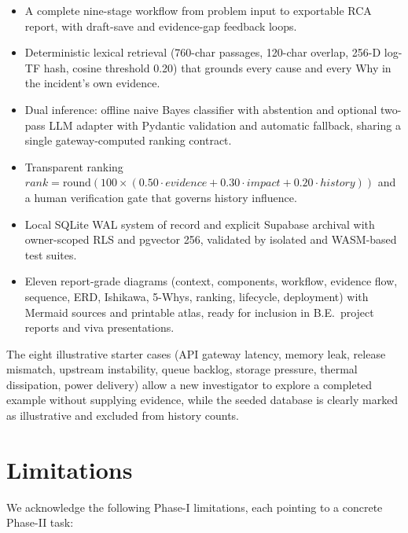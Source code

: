\documentclass[12pt,a4paper,oneside]{report}
\begin{document}
\begin{itemize}
\item A complete nine-stage workflow from problem input to exportable RCA report, with draft-save and evidence-gap feedback loops.
\item Deterministic lexical retrieval (760-char passages, 120-char overlap, 256-D log-TF hash, cosine threshold 0.20) that grounds every cause and every Why in the incident's own evidence.
\item Dual inference: offline naive Bayes classifier with abstention and optional two-pass LLM adapter with Pydantic validation and automatic fallback, sharing a single gateway-computed ranking contract.
\item Transparent ranking $rank = \text{round}(100\times(0.50\cdot evidence+0.30\cdot impact+0.20\cdot history))$ and a human verification gate that governs history influence.
\item Local SQLite WAL system of record and explicit Supabase archival with owner-scoped RLS and pgvector 256, validated by isolated and WASM-based test suites.
\item Eleven report-grade diagrams (context, components, workflow, evidence flow, sequence, ERD, Ishikawa, 5-Whys, ranking, lifecycle, deployment) with Mermaid sources and printable atlas, ready for inclusion in B.E.\ project reports and viva presentations.
\end{itemize}

The eight illustrative starter cases (API gateway latency, memory leak, release mismatch, upstream instability, queue backlog, storage pressure, thermal dissipation, power delivery) allow a new investigator to explore a completed example without supplying evidence, while the seeded database is clearly marked as illustrative and excluded from history counts.

\section{Limitations}
We acknowledge the following Phase-I limitations, each pointing to a concrete Phase-II task:
\end{document}
